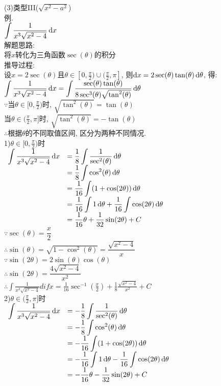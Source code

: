 (3)类型III($\sqrt{x^2-a^2}$)\\
例.\\
$\displaystyle\int\frac{1}{x^3\sqrt{x^2-4}}\mathop{}\!\mathrm{d} x$\\
解题思路:\\
将$x$转化为三角函数$\sec(\theta)$的积分\\
推导过程:\\
设$x=2\sec(\theta)$且$\theta\in[0,\frac{\pi}{2})\cup(\frac{\pi}{2},\pi]$, 则$\mathop{}\!\mathrm{d} x=2\sec(\theta)\tan(\theta)\mathop{}\!\mathrm{d}\theta$, 得:\\
$\displaystyle\int\frac{1}{x^3\sqrt{x^2-4}}\mathop{}\!\mathrm{d} x=\int\frac{\sec(\theta)\tan(\theta)}{8\sec^3(\theta)\sqrt{\tan^2(\theta)}}\mathop{}\!\mathrm{d}\theta$\\[1ex]
$\because$当$\theta\in[0,\frac{\pi}{2})$时, $\sqrt{\tan^2(\theta)}=\tan(\theta)$\\
\phantom{$\because$}当$\theta\in(\frac{\pi}{2},\pi]$时, $\sqrt{\tan^2(\theta)}=-\tan(\theta)$\\
$\therefore$根据$\theta$的不同取值区间, 区分为两种不同情况.\\
1)$\theta\in[0,\frac{\pi}{2})$时\\
$\begin{array}{>{\displaystyle}r >{\displaystyle}l}
\int\frac{1}{x^3\sqrt{x^2-4}}\dif x & =\frac{1}{8}\int\frac{1}{\sec^2(\theta)}\dif\theta\\[1ex]
& =\frac{1}{8}\int\cos^2(\theta)\dif\theta\\[1ex]
& =\frac{1}{16}\int(1+\cos(2\theta))\dif\theta\\[1ex]
& =\frac{1}{16}\int 1\dif\theta+\frac{1}{16}\int\cos(2\theta)\dif\theta\\[1ex]
& =\frac{1}{16}\theta+\frac{1}{32}\sin(2\theta)+C
\end{array}$\\
$\because\sec(\theta)=\dfrac{x}{2}$\\
$\therefore\sin(\theta)=\sqrt{1-\cos^2(\theta)}=\dfrac{\sqrt{x^2-4}}{x}$\\
$\because\sin(2\theta)=2\sin(\theta)\cos(\theta)$\\
$\therefore\sin(2\theta)=\dfrac{4\sqrt{x^2-4}}{x^2}$\\
$\displaystyle\therefore\int\frac{1}{x^3\sqrt{x^2-4}}dif x=\frac{1}{16}\sec^{-1}(\frac{x}{2})+\frac{1}{8}\frac{\sqrt{x^2-4}}{x^2}+C$\\[1ex]
2)$\theta\in(\frac{\pi}{2},\pi]$时\\
$\begin{array}{>{\displaystyle}r >{\displaystyle}l}
\int\frac{1}{x^3\sqrt{x^2-4}}\dif x & =-\frac{1}{8}\int\frac{1}{\sec^2(\theta)}\dif\theta\\[1ex]
& =-\frac{1}{8}\int\cos^2(\theta)\dif\theta\\[1ex]
& =-\frac{1}{16}\int(1+\cos(2\theta))\dif\theta\\[1ex]
& =-\frac{1}{16}\int 1\dif\theta-\frac{1}{16}\int\cos(2\theta)\dif\theta\\[1ex]
& =-\frac{1}{16}\theta-\frac{1}{32}\sin(2\theta)+C
\end{array}$\\[1ex]
